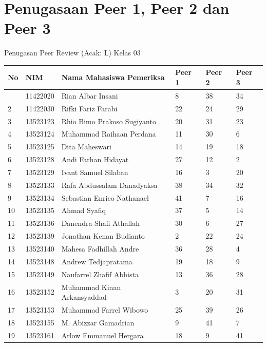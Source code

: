 \documentclass[
  letterpaper,
  DIV=11,
  numbers=noendperiod]{scrreprt}
\begin{document}
\section*{Penugasaan Peer 1, Peer 2 dan Peer
3}\label{penugasaan-peer-1-peer-2-dan-peer-3}


Penugasan Peer Review (Acak: L) Kelas 03

\begin{longtable}[]{@{}llllll@{}}
\toprule\noalign{}
No & NIM & Nama Mahasiswa Pemeriksa & Peer 1 & Peer 2 & Peer 3 \\
\midrule\noalign{}
\endhead
\bottomrule\noalign{}
\endlastfoot
1 & 11422020 & Rian Albar Insani & 8 & 38 & 34 \\
2 & 11422030 & Rifki Fariz Farabi & 22 & 24 & 29 \\
3 & 13523123 & Rhio Bimo Prakoso Sugiyanto & 20 & 31 & 23 \\
4 & 13523124 & Muhammad Raihaan Perdana & 11 & 30 & 6 \\
5 & 13523125 & Dita Maheswari & 14 & 19 & 18 \\
6 & 13523128 & Andi Farhan Hidayat & 27 & 12 & 2 \\
7 & 13523129 & Ivant Samuel Silaban & 16 & 3 & 20 \\
8 & 13523133 & Rafa Abdussalam Danadyaksa & 38 & 34 & 32 \\
9 & 13523134 & Sebastian Enrico Nathanael & 41 & 7 & 16 \\
10 & 13523135 & Ahmad Syafiq & 37 & 5 & 14 \\
11 & 13523136 & Danendra Shafi Athallah & 30 & 6 & 27 \\
12 & 13523139 & Jonathan Kenan Budianto & 2 & 22 & 24 \\
13 & 13523140 & Mahesa Fadhillah Andre & 36 & 28 & 4 \\
14 & 13523148 & Andrew Tedjapratama & 19 & 18 & 9 \\
15 & 13523149 & Naufarrel Zhafif Abhista & 13 & 36 & 28 \\
16 & 13523152 & Muhammad Kinan Arkansyaddad & 3 & 20 & 31 \\
17 & 13523153 & Muhammad Farrel Wibowo & 25 & 39 & 26 \\
18 & 13523155 & M. Abizzar Gamadrian & 9 & 41 & 7 \\
19 & 13523161 & Arlow Emmanuel Hergara & 18 & 9 & 41 \\

\end{longtable}
\end{document}
